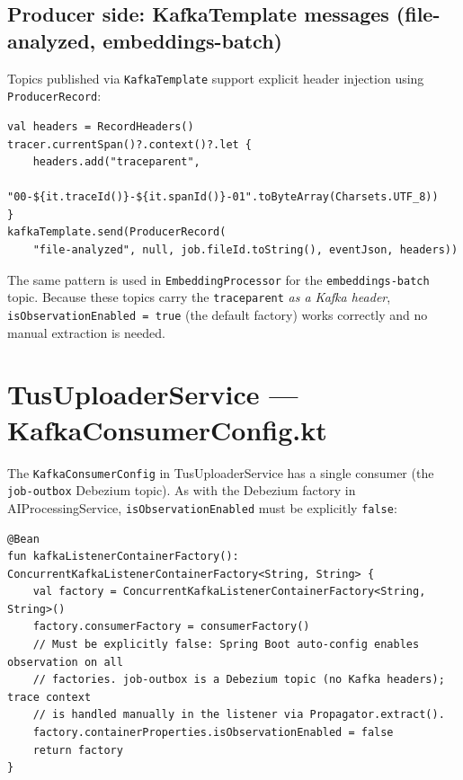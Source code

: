 \documentclass[11pt,a4paper]{article}
\begin{document}
\subsection{Producer side: KafkaTemplate messages (file-analyzed, embeddings-batch)}

Topics published via \texttt{KafkaTemplate} support explicit header injection
using \texttt{ProducerRecord}:

\begin{lstlisting}[style=kotlin, caption={MetadataProcessor.kt --- publishFileAnalyzedEvent()}]
val headers = RecordHeaders()
tracer.currentSpan()?.context()?.let {
    headers.add("traceparent",
        "00-${it.traceId()}-${it.spanId()}-01".toByteArray(Charsets.UTF_8))
}
kafkaTemplate.send(ProducerRecord(
    "file-analyzed", null, job.fileId.toString(), eventJson, headers))
\end{lstlisting}

The same pattern is used in \texttt{EmbeddingProcessor} for the
\texttt{embeddings-batch} topic.  Because these topics carry the
\texttt{traceparent} \emph{as a Kafka header}, \texttt{isObservationEnabled =
true} (the default factory) works correctly and no manual extraction is needed.

\section{TusUploaderService --- KafkaConsumerConfig.kt}

The \texttt{KafkaConsumerConfig} in TusUploaderService has a single consumer
(the \texttt{job-outbox} Debezium topic).  As with the Debezium factory in
AIProcessingService, \texttt{isObservationEnabled} must be explicitly
\texttt{false}:

\begin{lstlisting}[style=kotlin, caption={TusUploaderService --- KafkaConsumerConfig.kt}]
@Bean
fun kafkaListenerContainerFactory(): ConcurrentKafkaListenerContainerFactory<String, String> {
    val factory = ConcurrentKafkaListenerContainerFactory<String, String>()
    factory.consumerFactory = consumerFactory()
    // Must be explicitly false: Spring Boot auto-config enables observation on all
    // factories. job-outbox is a Debezium topic (no Kafka headers); trace context
    // is handled manually in the listener via Propagator.extract().
    factory.containerProperties.isObservationEnabled = false
    return factory
}
\end{lstlisting}
\end{document}

